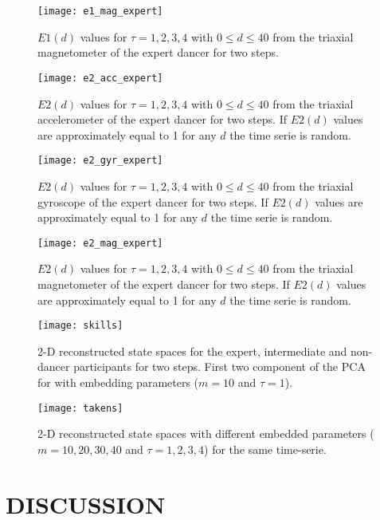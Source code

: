 \documentclass{sigchi}
\begin{document}
      \begin{figure}[htbp!] 
  \centering    
  \texttt{[image: e1\_mag\_expert]}
  \caption[PA]{$E1(d)$ values for $\tau=1,2,3,4$ with $0 \leq d \leq 40$
  from the triaxial magnetometer of the expert dancer for two steps.}
  \label{fig:e1mag}
  \end{figure}
    \begin{figure}[htbp!] 
  \centering    
  \texttt{[image: e2\_acc\_expert]}
  \caption[PA]{$E2(d)$ values for $\tau=1,2,3,4$ with $0 \leq d \leq40 $
  from the triaxial accelerometer of the expert dancer for two steps.
  If $E2(d)$ values are approximately equal to 1 for any $d$ the time serie is random.
  }
  \label{fig:e2acc}
  \end{figure}
      \begin{figure}[htbp!] 
  \centering    
  \texttt{[image: e2\_gyr\_expert]}
  \caption[PA]{$E2(d)$ values for $\tau=1,2,3,4$ with $0 \leq d \leq40 $
  from the triaxial gyroscope of the expert dancer for two steps.
  If $E2(d)$ values are approximately equal to 1 for any $d$ the time serie is random.
  }
  \label{fig:e2gyr}
  \end{figure}
      \begin{figure}[htbp!] 
  \centering    
  \texttt{[image: e2\_mag\_expert]}
  \caption[PA]{$E2(d)$ values for $\tau=1,2,3,4$ with $0 \leq d \leq40 $
  from the triaxial magnetometer of the expert dancer for two steps.
  If $E2(d)$ values are approximately equal to 1 for any $d$ the time serie is random.
  }
  \label{fig:e2mag}
  \end{figure}  
  \begin{figure}[htbp!] 
  \centering    
  \texttt{[image: skills]}
  \caption[PA]{2-D reconstructed state spaces for the expert, intermediate and 
  non-dancer participants for two steps. First two component of the PCA
  for with embedding parameters ($m = 10$ and $\tau = 1$).}
  \label{fig:skills}
  \end{figure}
\begin{figure}[htbp!] 
\centering    
\texttt{[image: takens]}
\caption[PA]{2-D reconstructed state spaces with different embedded parameters ($m=10,20,30,40$ and $\tau= 1,2,3,4$)
for the same time-serie.}
\label{fig:takens_problem}
\end{figure}



 \section{DISCUSSION}
 
\end{document}
